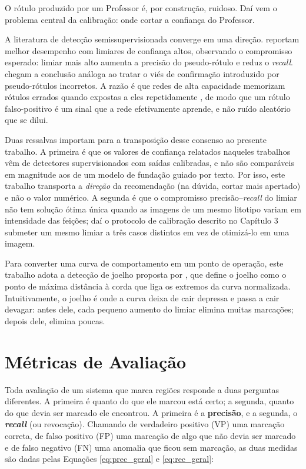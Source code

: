 O rótulo produzido por um Professor é, por construção, ruidoso. Daí vem o problema central da calibração: onde cortar a confiança do Professor.

A literatura de detecção semissupervisionada converge em uma direção.  reportam melhor desempenho com limiares de confiança altos, observando o compromisso esperado: limiar mais alto aumenta a precisão do pseudo-rótulo e reduz o \textit{recall}.  chegam a conclusão análoga ao tratar o viés de confirmação introduzido por pseudo-rótulos incorretos. A razão é que redes de alta capacidade memorizam rótulos errados quando expostas a eles repetidamente \cite{memorization_arpit2017}, de modo que um rótulo falso-positivo é um sinal que a rede efetivamente aprende, e não ruído aleatório que se dilui.

Duas ressalvas importam para a transposição desse consenso ao presente trabalho. A primeira é que os valores de confiança relatados naqueles trabalhos vêm de detectores supervisionados com saídas calibradas, e não são comparáveis em magnitude aos de um modelo de fundação guiado por texto. Por isso, este trabalho transporta a \textit{direção} da recomendação (na dúvida, cortar mais apertado) e não o valor numérico. A segunda é que o compromisso precisão--\textit{recall} do limiar não tem solução ótima única quando as imagens de um mesmo litotipo variam em intensidade das feições; daí o protocolo de calibração descrito no Capítulo 3 submeter um mesmo limiar a três casos distintos em vez de otimizá-lo em uma imagem.

Para converter uma curva de comportamento em um ponto de operação, este trabalho adota a detecção de joelho proposta por , que define o joelho como o ponto de máxima distância à corda que liga os extremos da curva normalizada. Intuitivamente, o joelho é onde a curva deixa de cair depressa e passa a cair devagar: antes dele, cada pequeno aumento do limiar elimina muitas marcações; depois dele, elimina poucas.

\section{Métricas de Avaliação}
\label{sec:metricas}

Toda avaliação de um sistema que marca regiões responde a duas perguntas diferentes. A primeira é quanto do que ele marcou está certo; a segunda, quanto do que devia ser marcado ele encontrou. A primeira é a \textbf{precisão}, e a segunda, o \textbf{\textit{recall}} (ou revocação). Chamando de verdadeiro positivo (VP) uma marcação correta, de falso positivo (FP) uma marcação de algo que não devia ser marcado e de falso negativo (FN) uma anomalia que ficou sem marcação, as duas medidas são dadas pelas Equações \ref{eq:prec_geral} e \ref{eq:rec_geral}:

